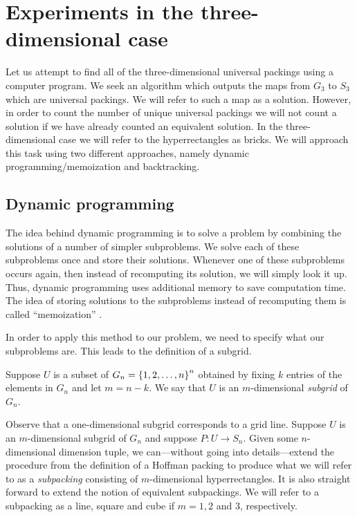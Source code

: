 \section{Experiments in the three-dimensional case}
\noindent Let us attempt to find all of the three-dimensional universal packings using a computer program. We seek an algorithm which outputs the maps from $G_3$ to $S_3$ which are universal packings. We will refer to such a map as a solution. However, in order to count the number of unique universal packings we will not count a solution if we have already counted an equivalent solution. In the three-dimensional case we will refer to the hyperrectangles as bricks. We will approach this task using two different approaches, namely dynamic programming/memoization and backtracking.

\subsection{Dynamic programming}
The idea behind dynamic programming \cite[p. 359]{cormen_leiserson_rivest_stein_2009} is to solve a problem by combining the solutions of a number of simpler subproblems. We solve each of these subproblems once and store their solutions. Whenever one of these subproblems occurs again, then instead of recomputing its solution, we will simply look it up. Thus, dynamic programming uses additional memory to save computation time. The idea of storing solutions to the subproblems instead of recomputing them is called ``memoization'' \cite[p. 365]{cormen_leiserson_rivest_stein_2009}.

In order to apply this method to our problem, we need to specify what our subproblems are. This leads to the definition of a subgrid.

\begin{definition}[Subgrid]
Suppose $U$ is a subset of $G_n = \left\{ 1, 2, \dotsc, n \right\}^n$ obtained by fixing $k$ entries of the elements in $G_n$ and let $m = n - k$. We say that $U$ is an $m$-dimensional \textit{subgrid} of $G_n$.
\end{definition}

\noindent Observe that a one-dimensional subgrid corresponds to a grid line. Suppose $U$ is an $m$-dimensional subgrid of $G_n$ and suppose $P\colon U \to S_n$. Given some $n$-dimensional dimension tuple, we can---without going into details---extend the procedure from the definition of a Hoffman packing to produce what we will refer to as a \textit{subpacking} consisting of $m$-dimensional hyperrectangles. It is also straight forward to extend the notion of equivalent subpackings. We will refer to a subpacking as a line, square and cube if $m = 1, 2$ and $3$, respectively.

